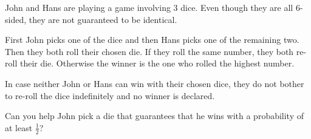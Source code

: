 

%

John and Hans are playing a game involving 3 dice. Even though they are
all 6-sided, they are not guaranteed to be identical.

\medskip

\noindent
First John picks one of the dice and then Hans picks one of the
remaining two. Then they both roll their chosen die. If they roll the
same number, they both re-roll their die. Otherwise the winner is the
one who rolled the highest number.

\noindent
In case neither John or Hans can win with their chosen dice, they do not bother to
re-roll the dice indefinitely and no winner is declared.

\medskip

\noindent
Can you help John pick a die that guarantees that he wins with a
probability of at least $\frac{1}{2}$?

